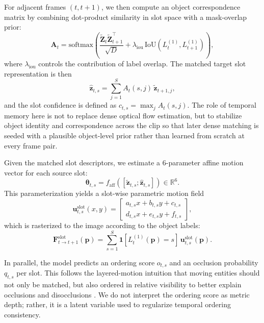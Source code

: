 For adjacent frames $(t,t+1)$, we then compute an object correspondence matrix by combining dot-product similarity in slot space with a mask-overlap prior:
\begin{equation}
\label{eq:slot_matching}
\mathbf{A}_t = \mathrm{softmax}\left(\frac{\widetilde{\mathbf{Z}}_t\widetilde{\mathbf{Z}}_{t+1}^{\top}}{\sqrt{D}} + \lambda_{\mathrm{iou}}\,\mathrm{IoU}(L_t^{(1)},L_{t+1}^{(1)})\right),
\end{equation}
where $\lambda_{\mathrm{iou}}$ controls the contribution of label overlap. The matched target slot representation is then
\begin{equation}
\hat{\mathbf{z}}_{t,s} = \sum_{j=1}^{S} A_t(s,j)\,\tilde{\mathbf{z}}_{t+1,j},
\end{equation}
and the slot confidence is defined as $c_{t,s}=\max_j A_t(s,j)$. The role of temporal memory here is not to replace dense optical flow estimation, but to stabilize object identity and correspondence across the clip so that later dense matching is seeded with a plausible object-level prior rather than learned from scratch at every frame pair.

Given the matched slot descriptors, we estimate a 6-parameter affine motion vector for each source slot:
\begin{equation}
\boldsymbol{\theta}_{t,s} = f_{\mathrm{aff}}\left([\tilde{\mathbf{z}}_{t,s};\hat{\mathbf{z}}_{t,s}]\right) \in \mathbb{R}^{6}.
\end{equation}
This parameterization yields a slot-wise parametric motion field
\begin{equation}
\mathbf{u}_{t,s}^{\mathrm{slot}}(x,y) =
\begin{bmatrix}
a_{t,s}x + b_{t,s}y + c_{t,s}\\
d_{t,s}x + e_{t,s}y + f_{t,s}
\end{bmatrix},
\end{equation}
which is rasterized to the image according to the object labels:
\begin{equation}
\mathbf{F}^{\mathrm{slot}}_{t\rightarrow t+1}(\mathbf{p}) = \sum_{s=1}^{S} \mathbf{1}[L_t^{(1)}(\mathbf{p})=s] \, \mathbf{u}_{t,s}^{\mathrm{slot}}(\mathbf{p}).
\end{equation}

In parallel, the model predicts an ordering score $o_{t,s}$ and an occlusion probability $q_{t,s}$ per slot. This follows the layered-motion intuition that moving entities should not only be matched, but also ordered in relative visibility to better explain occlusions and disocclusions \cite{wang1994representing,sevillalara2016optical}. We do not interpret the ordering score as metric depth; rather, it is a latent variable used to regularize temporal ordering consistency.

